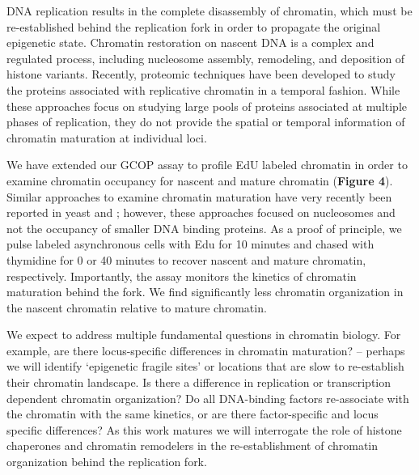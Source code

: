 DNA replication results in the complete disassembly of chromatin, which must be re-established behind the replication fork in order to propagate the original epigenetic state. Chromatin restoration on nascent DNA is a complex and regulated process, including nucleosome assembly, remodeling, and deposition of histone variants\citep{MacAlpine2013-ds}.  Recently, proteomic techniques have been developed to study the proteins associated with replicative chromatin in a temporal fashion\citep{Alabert2014-io,Sirbu2011-wx}. %
While these approaches focus on studying large pools of proteins associated at multiple phases of replication, they do not provide the spatial or temporal information of chromatin maturation at individual loci. 

We have extended our GCOP assay to profile EdU labeled chromatin in order to examine chromatin occupancy for nascent and mature chromatin ({\color{dukeblue}\textbf{Figure 4}}).  Similar approaches to examine chromatin maturation have very recently been reported in yeast\citep{Vasseur2016-rx} and \dros\citep{Ramachandran2016-zu}; however, these approaches focused on nucleosomes and not the occupancy of smaller DNA binding proteins.  As a proof of principle, we pulse labeled asynchronous cells with Edu for 10 minutes and chased with thymidine for 0 or 40 minutes to recover nascent and mature chromatin, respectively.  Importantly, the  assay monitors the kinetics of chromatin maturation behind the fork. We find significantly less chromatin organization in the nascent chromatin relative to mature chromatin. %

We expect to address multiple fundamental questions in chromatin biology. For example, are there locus-specific differences in chromatin maturation? -- perhaps we will identify `epigenetic fragile sites' or locations that are slow to re-establish their chromatin landscape. Is there a difference in replication or transcription dependent chromatin organization? Do all DNA-binding factors re-associate with the chromatin with the same kinetics, or are there factor-specific and locus specific differences?   As this work matures we will interrogate the role of histone chaperones and chromatin remodelers in the re-establishment of chromatin organization behind the replication fork.  


